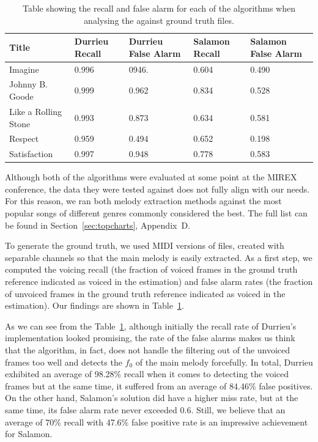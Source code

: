 \begin{table}[b]
\begin{center}
\begin{tabular} {| p{5cm}| p{1.75cm} | p{1.75cm} | p{1.75cm} | p{1.75cm} |} \hline
Title 	& Durrieu Recall & Durrieu False Alarm 	& Salamon Recall 	& Salamon False Alarm \\ \hline \hline
Imagine						& 0.996		& 0946.		& 0.604			& 0.490		\\	\hline
Johnny B. Goode		& 0.999		& 0.962		& 0.834			& 0.528		\\ 	\hline
Like a Rolling Stone	& 0.993		& 0.873		& 0.634			& 0.581		\\ 	\hline
Respect						& 0.959		& 0.494		& 0.652			& 0.198		\\ 	\hline
Satisfaction				& 0.997		& 0.948		& 0.778			& 0.583		\\	\hline
\end{tabular}
\caption{Table showing the recall and false alarm for each of the algorithms when analysing the against ground truth files.}
\label{table:voicedunvoiced}
\end{center}
\end{table}

Although both of the algorithms were evaluated at some point at the MIREX conference, the data they were tested against does not fully align with our needs. For this reason, we ran both melody extraction methods against the most popular songs of different genres commonly considered the best. The full list can be found in Section~\ref{sec:topcharts}, Appendix~D.

To generate the ground truth, we used MIDI versions of files, created with separable channels so that the main melody is easily extracted. As a first step, we computed the voicing recall (the fraction of voiced frames in the ground truth reference indicated as voiced in the estimation) and false alarm rates (the fraction of unvoiced frames in the ground truth reference indicated as voiced in the estimation).
Our findings are shown in Table~\ref{table:voicedunvoiced}.


As we can see from the Table~\ref{table:voicedunvoiced}, although initially the recall rate of Durrieu's implementation looked promising, the rate of the false alarms makes us think that the algorithm, in fact, does not handle the filtering out of the unvoiced frames too well and detects the $f_{0}$ of the main melody forcefully. In total, Durrieu exhibited an average of 98.28\% recall when it comes to detecting the voiced frames but at the same time, it suffered from an average of 84.46\% false positives. On the other hand, Salamon's solution did have a higher miss rate, but at the same time, its false alarm rate never exceeded 0.6. Still, we believe that an average of 70\% recall with 47.6\% false positive rate is an impressive achievement for Salamon.

